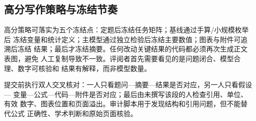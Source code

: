 \subsection{高分写作策略与冻结节奏}

高分策略可落实为五个冻结点：定题后冻结任务矩阵；基线通过手算/小规模枚举后
冻结变量和统计定义；主模型通过独立检验后冻结主要数值；图表与附件可追溯后冻结
结果；最后才冻结摘要。任何改动关键结果的代码都必须再次生成正文表图，避免
人工复制导致不一致。评阅者首先需要看见的是问题闭合、模型合理、数字可核验和
结果有解释，而非模型数量。

提交前执行双人交叉核对：一人只看题问—摘要—结果是否对应，另一人只看假设—
变量—公式—代码—附件是否对应；最后由未撰写该段的人检查引用、单位、有效
数字、图表位置和页面溢出。审计脚本用于发现结构和引用问题，但不能替代公式
正确性、学术判断和原始页面核验。

